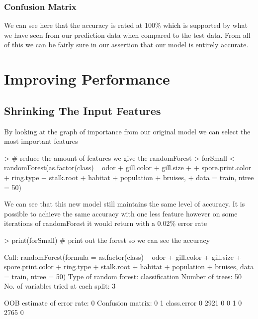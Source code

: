 \documentclass[12pt]{article}         %
\begin{document}
\pagebreak\subsubsection{Confusion Matrix}
\begin{Schunk}
\end{Schunk}
We can see here that the accuracy is rated at 100\% which is supported by what we have seen from our prediction data when compared to the test data. From all of this we can be fairly sure in our assertion that our model is entirely accurate.

\pagebreak\section{Improving Performance}
\subsection{Shrinking The Input Features}
By looking at the graph of importance from our original model we can select the most important features
\begin{Schunk}
\begin{Sinput}
> # reduce the amount of features we give the randomForest
> forSmall <- randomForest(as.factor(class) ~ odor + gill.color + gill.size +
+ 		spore.print.color + ring.type + stalk.root + habitat + population + bruises,
+ 	data = train, ntree = 50)
\end{Sinput}
\end{Schunk}

We can see that this new model still maintains the same level of accuracy. It is possible to achieve the same accuracy with one less feature however on some iterations of randomForest it would return with a 0.02\% error rate
\begin{Schunk}
\begin{Sinput}
> print(forSmall) # print out the forest so we can see the accuracy
\end{Sinput}
\begin{Soutput}
Call:
 randomForest(formula = as.factor(class) ~ odor + gill.color +      gill.size + spore.print.color + ring.type + stalk.root +      habitat + population + bruises, data = train, ntree = 50) 
               Type of random forest: classification
                     Number of trees: 50
No. of variables tried at each split: 3

        OOB estimate of  error rate: 0%
Confusion matrix:
     0    1 class.error
0 2921    0           0
1    0 2765           0
\end{Soutput}
\end{Schunk}
\end{document}
